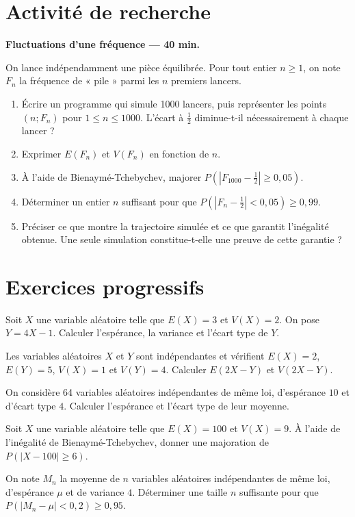 \section{Activité de recherche}\textbf{Fluctuations d'une fréquence --- 40 min.}\par On lance indépendamment une pièce équilibrée. Pour tout entier $n\ge1$, on note $F_n$ la fréquence de « pile » parmi les $n$ premiers lancers.
\begin{enumerate}\item Écrire un programme qui simule 1000 lancers, puis représenter les points $(n;F_n)$ pour $1\le n\le1000$. L'écart à $\frac12$ diminue-t-il nécessairement à chaque lancer ?
\item Exprimer $E(F_n)$ et $V(F_n)$ en fonction de $n$.
\item À l'aide de Bienaymé-Tchebychev, majorer $P(|F_{1000}-\frac12|\ge0{,}05)$.
\item Déterminer un entier $n$ suffisant pour que $P(|F_n-\frac12|<0{,}05)\ge0{,}99$.
\item Préciser ce que montre la trajectoire simulée et ce que garantit l'inégalité obtenue. Une seule simulation constitue-t-elle une preuve de cette garantie ?\end{enumerate}

\section{Exercices progressifs}

Soit $X$ une variable aléatoire telle que $E(X)=3$ et $V(X)=2$. On pose $Y=4X-1$. Calculer l'espérance, la variance et l'écart type de $Y$.

Les variables aléatoires $X$ et $Y$ sont indépendantes et vérifient $E(X)=2$, $E(Y)=5$, $V(X)=1$ et $V(Y)=4$. Calculer $E(2X-Y)$ et $V(2X-Y)$.

On considère 64 variables aléatoires indépendantes de même loi, d'espérance $10$ et d'écart type $4$. Calculer l'espérance et l'écart type de leur moyenne.

Soit $X$ une variable aléatoire telle que $E(X)=100$ et $V(X)=9$. À l'aide de l'inégalité de Bienaymé-Tchebychev, donner une majoration de $P(|X-100|\ge6)$.

On note $M_n$ la moyenne de $n$ variables aléatoires indépendantes de même loi, d'espérance $\mu$ et de variance $4$. Déterminer une taille $n$ suffisante pour que $P(|M_n-\mu|<0{,}2)\ge0{,}95$.

